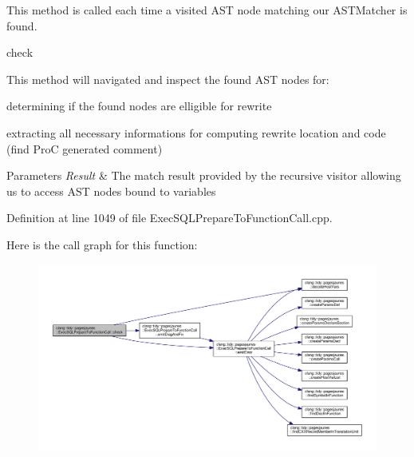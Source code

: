 This method is called each time a visited A\+ST node matching our A\+S\+T\+Matcher is found. 

check

This method will navigated and inspect the found A\+ST nodes for\+:
\begin{DoxyItemize}
\item determining if the found nodes are elligible for rewrite
\item extracting all necessary informations for computing rewrite location and code (find ProC generated comment)
\end{DoxyItemize}


\begin{DoxyParams}{Parameters}
{\em Result} & The match result provided by the recursive visitor allowing us to access A\+ST nodes bound to variables \\
\hline
\end{DoxyParams}


Definition at line 1049 of file Exec\+S\+Q\+L\+Prepare\+To\+Function\+Call.\+cpp.

Here is the call graph for this function\+:
\nopagebreak
\begin{figure}[H]
\begin{center}
\leavevmode
\includegraphics[width=350pt]{classclang_1_1tidy_1_1pagesjaunes_1_1_exec_s_q_l_prepare_to_function_call_a113ff5dac44508cad49d6ae7e9688008_cgraph}
\end{center}
\end{figure}
\mbox{\label{classclang_1_1tidy_1_1pagesjaunes_1_1_exec_s_q_l_prepare_to_function_call_a75ae581d7112559add71e34482ca8566}} 
